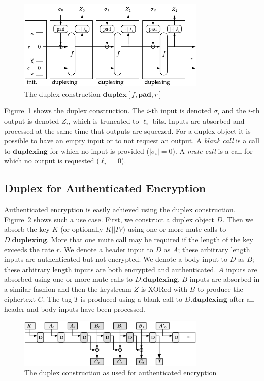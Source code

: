 \begin{figure}[ht]
\centering
\includegraphics[width=0.8\textwidth]{img/Duplex.pdf}
\caption{The duplex construction $\mathbf{duplex}[f,\mathbf{pad},r]$ \cite{Bertoni2011_SpongeFunctions}}
\label{fig:Duplex}
\end{figure}
Figure~\ref{fig:Duplex} shows the duplex construction.
The $i$-th input is denoted $\sigma_i$ and the $i$-th output is denoted $Z_i$, which is truncated to $\ell_i$ bits.
Inputs are absorbed and processed at the same time that outputs are squeezed.
For a duplex object it is possible to have an empty input or to not request an output.
A \emph{blank call} is a call to $\mathbf{duplexing}$ for which no input is provided ($|\sigma_i| = 0$).
A \emph{mute call} is a call for which no output is requested ($\ell_i = 0$).

\subsection{Duplex for Authenticated Encryption}
Authenticated encryption is easily achieved using the duplex construction.
Figure~\ref{fig:DuplexAE_Expanded} shows such a use case.
First, we construct a duplex object $D$.
Then we absorb the key $K$ (or optionally $K||IV$) using one or more mute calls to $D.\mathbf{duplexing}$.
More that one mute call may be required if the length of the key exceeds the rate $r$.
We denote a header input to $D$ as $A$; these arbitrary length inputs are authenticated but not encrypted.
We denote a body input to $D$ as $B$; these arbitrary length inputs are both encrypted and authenticated.
$A$ inputs are absorbed using one or more mute calls to $D.\mathbf{duplexing}$.
$B$ inputs are absorbed in a similar fashion and then the keystream $Z$ is XORed with $B$ to produce the ciphertext $C$.
The tag $T$ is produced using a blank call to $D.\mathbf{duplexing}$ after all header and body inputs have been processed.

\begin{figure}[ht]
\centering
\includegraphics[width=0.8\textwidth]{img/DuplexAE_Expanded-BW.png}
\caption{The duplex construction as used for authenticated encryption \cite{Bertoni2010_DuplexingSlides}}
\label{fig:DuplexAE_Expanded}
\end{figure}

